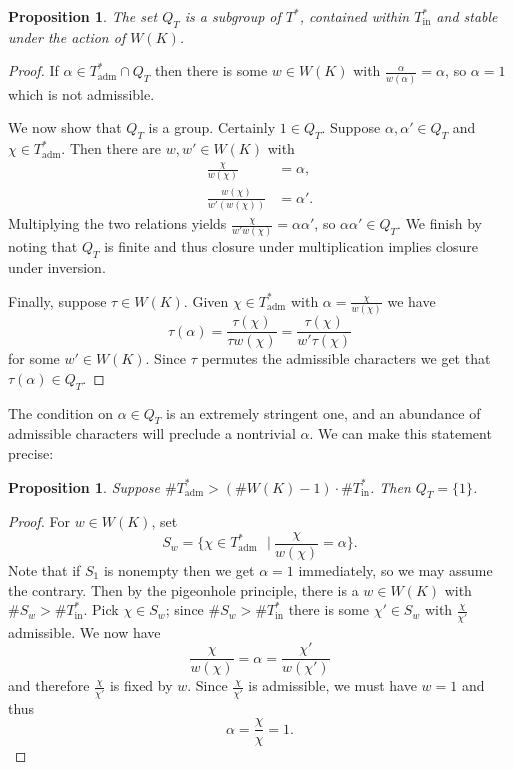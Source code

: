 \documentclass{amsart}
\theoremstyle{plain}
\newtheorem{proposition}[theorem]{Proposition}
\theoremstyle{definition}
\numberwithin{equation}{section}
\newcommand{\st}{\ensuremath{\ \ \ \vert\ }}
\newcommand{\Thadm}{T^*_{\operatorname{adm}}}
\newcommand{\Thinadm}{T^*_{\operatorname{in}}}
\newcommand{\hatT}{T^*}
\begin{document}
\begin{proposition} \label{irr-sub}
The set $Q_T$ is a subgroup of $\hatT$, contained within $\Thinadm$ and stable under the action of $W(K)$.
\end{proposition}
\begin{proof}
If $\alpha \in \Thadm \cap Q_T$ then there is some $w \in W(K)$ with
$\frac{\alpha}{w(\alpha)} = \alpha$, so $\alpha = 1$ which is not admissible.

We now show that $Q_T$ is a group.  Certainly $1 \in Q_T$.  Suppose
$\alpha, \alpha' \in Q_T$ and $\chi \in \Thadm$.  Then there are $w, w' \in W(K)$ with
\begin{align*}
\frac{\chi}{w(\chi)} &= \alpha, \\
\frac{w(\chi)}{w'(w(\chi))} &= \alpha'.
\end{align*}
Multiplying the two relations yields $\frac{\chi}{w'w(\chi)} = \alpha\alpha'$, so
$\alpha\alpha' \in Q_T$.  We finish by noting that $Q_T$ is finite and thus closure under
multiplication implies closure under inversion.

Finally, suppose $\tau \in W(K)$.  Given $\chi \in \Thadm$ with $\alpha = \frac{\chi}{w(\chi)}$ we have
$$\tau(\alpha) = \frac{\tau(\chi)}{\tau w(\chi)} = \frac{\tau(\chi)}{w' \tau(\chi)}$$
for some $w' \in W(K)$.  Since $\tau$ permutes the admissible characters we get that $\tau(\alpha) \in Q_T$.
\end{proof}

The condition on $\alpha \in Q_T$ is an extremely stringent one, and an abundance of admissible
characters will preclude a nontrivial $\alpha$.  We can make this statement precise:

\begin{proposition} \label{pigeonhole}
Suppose $\#\Thadm > (\# W(K) - 1) \cdot \# \Thinadm$.  Then $Q_T = \{ 1 \}$.
\end{proposition}
\begin{proof}
For $w \in W(K)$, set
$$S_w = \{\chi \in \Thadm \st  \frac{\chi}{w(\chi)} = \alpha\}.$$
Note that if $S_1$ is nonempty then we get $\alpha = 1$ immediately, so we may
assume the contrary.  Then by the pigeonhole principle, there is a $w \in W(K)$
with $\# S_w > \# \Thinadm$.  Pick $\chi \in S_w$; since $\# S_w > \#\Thinadm$
there is some $\chi' \in S_w$ with $\frac{\chi}{\chi'}$ admissible.  We now have
$$\frac{\chi}{w(\chi)} = \alpha = \frac{\chi'}{w(\chi')}$$
and therefore $\frac{\chi}{\chi'}$ is fixed by $w$.  Since $\frac{\chi}{\chi'}$ is admissible, we must have $w = 1$ and thus
$$\alpha = \frac{\chi}{\chi} = 1.$$
\end{proof}
\end{document}
